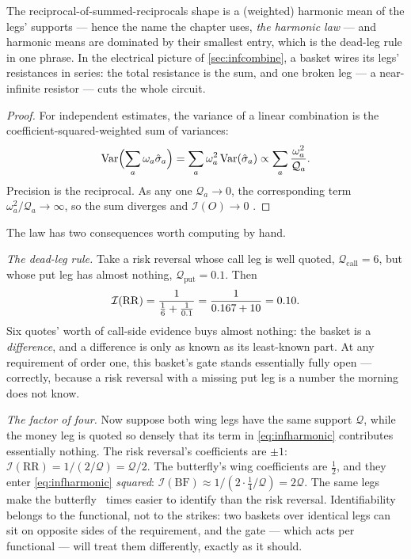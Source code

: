 The reciprocal-of-summed-reciprocals shape is a (weighted) harmonic
mean of the legs' supports --- hence the name the chapter uses,
\emph{the harmonic law} --- and harmonic means are dominated by
their smallest entry, which is the dead-leg rule in one phrase.  In
the electrical picture of \cref{sec:infcombine}, a basket wires its
legs' resistances in series: the total resistance is the sum, and
one broken leg --- a near-infinite resistor --- cuts the whole
circuit.

\begin{proof}
For independent estimates, the variance of a linear combination is
the coefficient-squared-weighted sum of variances:
\[
\operatorname{Var}\Bigl(\sum_a\omega_a\hat\sigma_a\Bigr)
=\sum_a\omega_a^2\operatorname{Var}(\hat\sigma_a)
\propto\sum_a\frac{\omega_a^2}{\mathcal{Q}_a}.
\]
Precision is the reciprocal.  As any one $\mathcal{Q}_a\to0$, the
corresponding term $\omega_a^2/\mathcal{Q}_a\to\infty$, so the sum
diverges and $\mathcal{I}(O)\to0$
\citep[the standard sampling theory of a linear functional;][]{LehmannCasella1998}.
\end{proof}

The law has two consequences worth computing by hand.

\emph{The dead-leg rule.}  Take a risk reversal whose call leg is
well quoted, $\mathcal{Q}_{\mathrm{call}}=6$, but whose put leg has
almost nothing, $\mathcal{Q}_{\mathrm{put}}=0.1$.  Then
\[
\mathcal{I}(\mathrm{RR})
=\frac{1}{\tfrac{1}{6}+\tfrac{1}{0.1}}
=\frac{1}{0.167+10}
=0.10 .
\]
Six quotes' worth of call-side evidence buys almost nothing: the
basket is a \emph{difference}, and a difference is only as known as
its least-known part.  At any requirement of order one, this basket's
gate stands essentially fully open --- correctly, because a risk
reversal with a missing put leg is a number the morning does not
know.

\emph{The factor of four.}  Now suppose both wing legs have the same
support $\mathcal{Q}$, while the money leg is quoted so densely that
its term in \cref{eq:infharmonic} contributes essentially nothing.
The risk reversal's coefficients are $\pm1$:
$\mathcal{I}(\mathrm{RR})=1/(2/\mathcal{Q})=\mathcal{Q}/2$.  The
butterfly's wing coefficients are $\tfrac12$, and they enter
\cref{eq:infharmonic} \emph{squared}:
$\mathcal{I}(\mathrm{BF})\approx1/(2\cdot\tfrac14/\mathcal{Q})
=2\mathcal{Q}$.  The same legs make the butterfly
\MacPriorBasketFactor\ times easier to identify than the risk
reversal.  Identifiability belongs to the functional, not to the
strikes: two baskets over identical legs can sit on opposite sides
of the requirement, and the gate --- which acts per functional ---
will treat them differently, exactly as it should.

